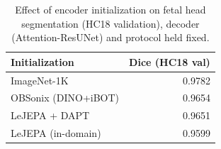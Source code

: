 \begin{table}[t]
\centering
\caption{Effect of encoder initialization on fetal head segmentation (HC18 validation), decoder (Attention-ResUNet) and protocol held fixed.}
\label{tab:init}
\begin{tabular}{lr}
\toprule
Initialization & Dice (HC18 val) \\
\midrule
ImageNet-1K & 0.9782 \\
OBSonix (DINO+iBOT) & 0.9654 \\
LeJEPA + DAPT & 0.9651 \\
LeJEPA (in-domain) & 0.9599 \\
\bottomrule
\end{tabular}
\end{table}